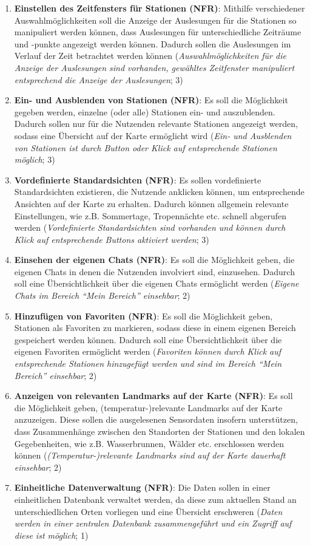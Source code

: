 \begin{enumerate}
    \item \textbf{Einstellen des Zeitfensters für Stationen (NFR)}: Mithilfe verschiedener Auswahlmöglichkeiten soll die Anzeige der Auslesungen für die Stationen so manipuliert werden können, dass Auslesungen für unterschiedliche Zeiträume und -punkte angezeigt werden können. Dadurch sollen die Auslesungen im Verlauf der Zeit betrachtet werden können (\textit{Auswahlmöglichkeiten für die Anzeige der Auslesungen sind vorhanden, gewähltes Zeitfenster manipuliert entsprechend die Anzeige der Auslesungen}; 3)
    \item \textbf{Ein- und Ausblenden von Stationen (NFR)}: Es soll die Möglichkeit gegeben werden, einzelne (oder alle) Stationen ein- und auszublenden. Dadurch sollen nur für die Nutzenden relevante Stationen angezeigt werden, sodass eine Übersicht auf der Karte ermöglicht wird (\textit{Ein- und Ausblenden von Stationen ist durch Button oder Klick auf entsprechende Stationen möglich}; 3)
    \item \textbf{Vordefinierte Standardsichten (NFR)}: Es sollen vordefinierte Standardsichten existieren, die Nutzende anklicken können, um entsprechende Ansichten auf der Karte zu erhalten. Dadurch können allgemein relevante Einstellungen, wie z.B. Sommertage, Tropennächte etc. schnell abgerufen werden (\textit{Vordefinierte Standardsichten sind vorhanden und können durch Klick auf entsprechende Buttons aktiviert werden}; 3)
    \item \textbf{Einsehen der eigenen Chats (NFR)}: Es soll die Möglichkeit geben, die eigenen Chats in denen die Nutzenden involviert sind, einzusehen. Dadurch soll eine Übersichtlichkeit über die eigenen Chats ermöglicht werden (\textit{Eigene Chats im Bereich \enquote{Mein Bereich} einsehbar}; 2)
    \item \textbf{Hinzufügen von Favoriten (NFR)}: Es soll die Möglichkeit geben, Stationen als Favoriten zu markieren, sodass diese in einem eigenen Bereich gespeichert werden können. Dadurch soll eine Übersichtlichkeit über die eigenen Favoriten ermöglicht werden (\textit{Favoriten können durch Klick auf entsprechende Stationen hinzugefügt werden und sind im Bereich \enquote{Mein Bereich} einsehbar}; 2)
    \item \textbf{Anzeigen von relevanten Landmarks auf der Karte (NFR)}: Es soll die Möglichkeit geben, (temperatur-)relevante Landmarks auf der Karte anzuzeigen. Diese sollen die ausgelesenen Sensordaten insofern unterstützen, dass Zusammenhänge zwischen den Standorten der Stationen und den lokalen Gegebenheiten, wie z.B. Wasserbrunnen, Wälder etc. erschlossen werden können (\textit{(Temperatur-)relevante Landmarks sind auf der Karte dauerhaft einsehbar}; 2)
    \item \textbf{Einheitliche Datenverwaltung (NFR)}: Die Daten sollen in einer einheitlichen Datenbank verwaltet werden, da diese zum aktuellen Stand an unterschiedlichen Orten vorliegen und eine Übersicht erschweren (\textit{Daten werden in einer zentralen Datenbank zusammengeführt und ein Zugriff auf diese ist möglich}; 1)
\end{enumerate}

